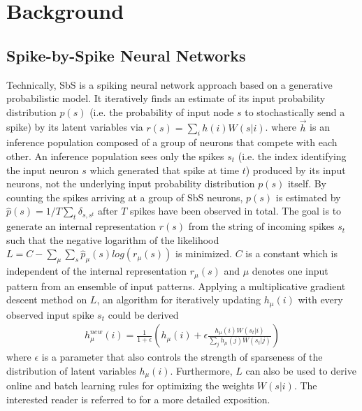 \section{Background}

\label{sec:background}

\subsection{Spike-by-Spike Neural Networks} 

\label{sec:sbs}

Technically, SbS is a spiking neural network approach based on a
generative probabilistic model. It iteratively finds an estimate of
its input probability distribution $p(s)$ (i.e. the probability of
input node $s$ to stochastically send a spike) by its latent variables
via $r(s) = \sum_i h(i) W(s|i)$. 
where $\vec{h}$ is an inference
population composed of a group of neurons that compete with each
other. An inference population sees only the spikes $s_t$ (i.e. the
index identifying the input neuron $s$ which generated that spike at
time $t$) produced by its input neurons, not the underlying input
probability distribution $p(s)$ itself. By counting the spikes
arriving at a group of SbS neurons, $p(s)$ is estimated by
$\hat{p}(s) = 1/T \sum_t \delta_{s,s^t}$ after $T$ spikes have been
observed in total. The goal is to generate an internal representation
$r(s)$ from the string of incoming spikes $s_t$ such that the negative
logarithm of the likelihood
$L = C - \sum_\mu \sum_s \hat{p}_\mu(s) log\left( r_\mu(s) \right)$ is
minimized. $C$ is a constant which is independent of the internal
representation $r_\mu(s)$ and $\mu$ denotes one input pattern from an
ensemble of input patterns. Applying a multiplicative gradient descent
method on $L$, an algorithm for iteratively updating $h_\mu(i)$ with
every observed input spike $s_t$ could be derived
\cite{ernst2007efficient}
\begin{eqnarray} \label{eq:sbs_update}
h_\mu^{new}(i) = \frac{1}{1+\epsilon} \left(h_\mu(i) + \epsilon \frac{h_\mu(i) W(s_t|i) }{\sum_j h_\mu(j) W(s_t|j)} \right) 
\end{eqnarray}
where $\epsilon$ is a parameter that also controls the strength of sparseness of the distribution of latent variables $h_\mu(i)$. Furthermore, $L$ can also be used to derive online and batch learning rules for optimizing the weights $W(s|i)$. The interested reader is referred to \cite{ernst2007efficient} for a more detailed exposition.

